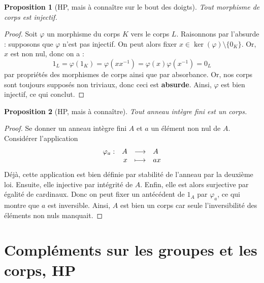 \documentclass[french]{book}
\newcommand{\inv}{^{-1}}
\theoremstyle{plain}
\newtheorem{prop}{Proposition}[chapter]
\theoremstyle{definition}
\theoremstyle{remark}
\begin{document}
\begin{prop}[HP, mais à connaître sur le bout des doigts]
	Tout morphisme de corps est injectif.
\end{prop}
\begin{proof}
	Soit $\varphi$ un morphisme du corps $K$ vers le corps $L$. Raisonnons par l'absurde : supposons que $\varphi$ n'est pas injectif. On peut alors fixer $x \in \ker(\varphi) \setminus \{0_K\}$. Or, $x$ est non nul, donc on a :
	$$1_L=\varphi(1_K)=\varphi(xx\inv)=\varphi(x)\varphi(x\inv)=0_L$$ par propriétés des morphismes de corps ainsi que par absorbance. Or, nos corps sont toujours supposés non triviaux, donc ceci est \textbf{absurde}. Ainsi, $\varphi$ est bien injectif, ce qui conclut.
\end{proof}
\begin{prop}[HP, mais à connaître]
	Tout anneau intègre fini est un corps.
\end{prop}
\begin{proof}
	Se donner un anneau intègre fini $A$ et $a$ un élément non nul de $A$. Considérer l'application
	$$
	\begin{array}[t]{lrcl}
		\varphi_a : & A & \longrightarrow & A \\
		& x & \longmapsto & ax
	\end{array}
	$$ Déjà, cette application est bien définie par stabilité de l'anneau par la deuxième loi. Ensuite, elle injective par intégrité de $A$. Enfin, elle est alors surjective par égalité de cardinaux. Donc on peut fixer un antécédent de $1_A$ par $\varphi_a$, ce qui montre que $a$ est inversible. Ainsi, $A$ est bien un corps car seule l'inversibilité des éléments non nuls manquait.
\end{proof}
\section{Compléments sur les groupes et les corps, HP}
\end{document}
